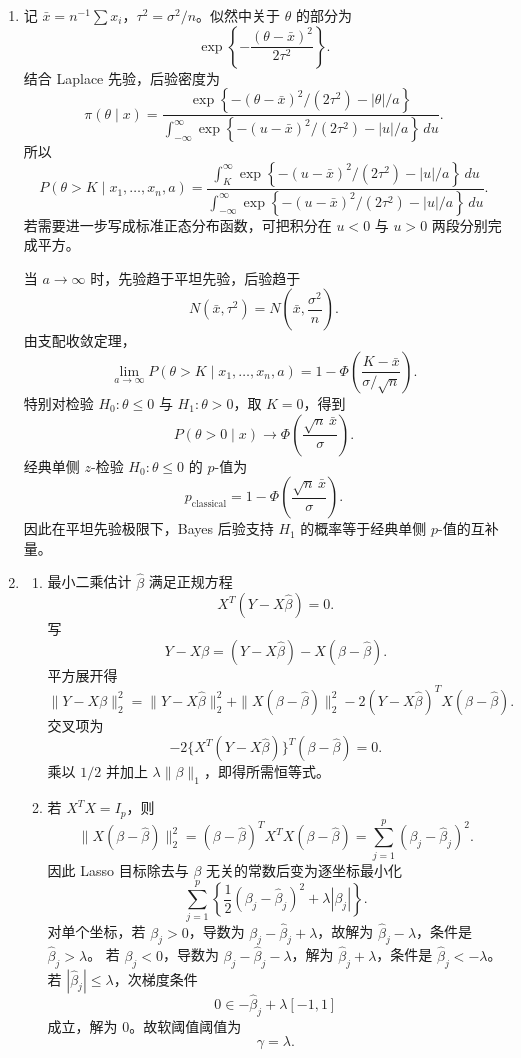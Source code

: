 \documentclass[UTF8,12pt]{ctexart}
\begin{document}
\begin{enumerate}[label=\textbf{\arabic*.},leftmargin=2.2em]
\item 记 \(\bar x=n^{-1}\sum x_i\)，\(\tau^2=\sigma^2/n\)。似然中关于 \(\theta\) 的部分为
\[
\exp\left\{-\frac{(\theta-\bar x)^2}{2\tau^2}\right\}.
\]
结合 Laplace 先验，后验密度为
\[
\pi(\theta\mid x)
=\frac{\exp\left\{-(\theta-\bar x)^2/(2\tau^2)-|\theta|/a\right\}}
{\int_{-\infty}^{\infty}\exp\left\{-(u-\bar x)^2/(2\tau^2)-|u|/a\right\}\,du}.
\]
所以
\[
P(\theta>K\mid x_1,\ldots,x_n,a)
=
\frac{\int_K^\infty \exp\left\{-(u-\bar x)^2/(2\tau^2)-|u|/a\right\}\,du}
{\int_{-\infty}^{\infty}\exp\left\{-(u-\bar x)^2/(2\tau^2)-|u|/a\right\}\,du}.
\]
若需要进一步写成标准正态分布函数，可把积分在 \(u<0\) 与 \(u>0\) 两段分别完成平方。

当 \(a\to\infty\) 时，先验趋于平坦先验，后验趋于
\[
N(\bar x,\tau^2)=N\left(\bar x,\frac{\sigma^2}{n}\right).
\]
由支配收敛定理，
\[
\lim_{a\to\infty}P(\theta>K\mid x_1,\ldots,x_n,a)
=1-\Phi\left(\frac{K-\bar x}{\sigma/\sqrt n}\right).
\]
特别对检验 \(H_0:\theta\le0\) 与 \(H_1:\theta>0\)，取 \(K=0\)，得到
\[
P(\theta>0\mid x)\to \Phi\left(\frac{\sqrt n\,\bar x}{\sigma}\right).
\]
经典单侧 \(z\)-检验 \(H_0:\theta\le0\) 的 \(p\)-值为
\[
p_{\mathrm{classical}}=1-\Phi\left(\frac{\sqrt n\,\bar x}{\sigma}\right).
\]
因此在平坦先验极限下，Bayes 后验支持 \(H_1\) 的概率等于经典单侧 \(p\)-值的互补量。

\item
\begin{enumerate}[label=\textbf{(\alph*)},leftmargin=2.4em]
\item 最小二乘估计 \(\widehat\beta\) 满足正规方程
\[
X^T(Y-X\widehat\beta)=0.
\]
写
\[
Y-X\beta=(Y-X\widehat\beta)-X(\beta-\widehat\beta).
\]
平方展开得
\[
\|Y-X\beta\|_2^2
=\|Y-X\widehat\beta\|_2^2+\|X(\beta-\widehat\beta)\|_2^2
-2(Y-X\widehat\beta)^TX(\beta-\widehat\beta).
\]
交叉项为
\[
-2\{X^T(Y-X\widehat\beta)\}^T(\beta-\widehat\beta)=0.
\]
乘以 \(1/2\) 并加上 \(\lambda\|\beta\|_1\)，即得所需恒等式。
\item 若 \(X^TX=I_p\)，则
\[
\|X(\beta-\widehat\beta)\|_2^2
=(\beta-\widehat\beta)^TX^TX(\beta-\widehat\beta)
=\sum_{j=1}^p(\beta_j-\widehat\beta_j)^2.
\]
因此 Lasso 目标除去与 \(\beta\) 无关的常数后变为逐坐标最小化
\[
\sum_{j=1}^p\left\{\frac12(\beta_j-\widehat\beta_j)^2+\lambda|\beta_j|\right\}.
\]
对单个坐标，若 \(\beta_j>0\)，导数为 \(\beta_j-\widehat\beta_j+\lambda\)，故解为 \(\widehat\beta_j-\lambda\)，条件是 \(\widehat\beta_j>\lambda\)。
若 \(\beta_j<0\)，导数为 \(\beta_j-\widehat\beta_j-\lambda\)，解为 \(\widehat\beta_j+\lambda\)，条件是 \(\widehat\beta_j<-\lambda\)。
若 \(|\widehat\beta_j|\le\lambda\)，次梯度条件
\[
0\in -\widehat\beta_j+\lambda[-1,1]
\]
成立，解为 \(0\)。故软阈值阈值为
\[
\gamma=\lambda.
\]
\end{enumerate}


\end{enumerate}
\end{document}
